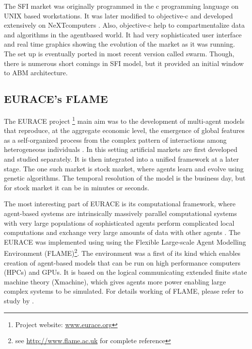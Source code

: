 \documentclass[12pt,a4paper]{article}
\numberwithin{equation}{section}
\numberwithin{figure}{section}
\numberwithin{table}{section}
\begin{document}
The SFI market was originally programmed in the c programming language on UNIX based workstations. It was
later modiﬁed to objective-c and developed extensively on NeXTcomputers \citep{LeBaron2002}. Also, objective-c help to compartmentalize data and algorithms in the agentbased world. It had very sophisticated user interface and real time graphics showing the evolution of the market as it was running. The set up is eventually ported in most recent version called swarm. Though, there is numerous short comings in SFI model, but it provided an initial window to ABM architecture.

\subsection{EURACE's FLAME}
The EURACE project \footnote{Project website: \url{www.eurace.org}} main aim was to the development of multi-agent models that reproduce, at the aggregate economic level, the emergence of global features as a self-organized process from the complex pattern of interactions among heterogeneous individuals \citep{eurace2008}. In this setting artificial markets are first developed and studied separately. It is then integrated into a unified framework at a later stage. The one such market is stock market, where agents learn and evolve using genetic algorithms. The temporal resolution of the model is the business day, but for stock market it can be in minutes or seconds.

The most interesting part of EURACE is its computational framework, where agent-based systems are intrinsically massively parallel computational systems with very large populations of sophisticated agents perform complicated local computations and exchange very large amounts of data with other agents \citep{eurace2008}. The EURACE was implemented using using the Flexible Large-scale Agent Modelling Environment (FLAME)\footnote{see \url{http://www.flame.ac.uk} for complete reference}. The environment was a ﬁrst of its kind which enables creation
of agent-based models that can be run on high performance computers (HPCs) and GPUs. It is based on the logical communicating extended ﬁnite state machine theory (Xmachine), which gives agents more power enabling large complex
systems to be simulated. For details working of FLAME, please refer to study by \citet{eurace2008}.
\end{document}
